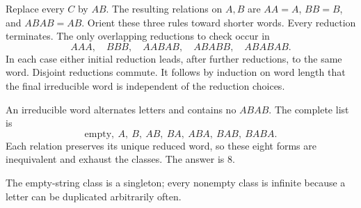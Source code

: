 Replace every $C$ by $AB$. The resulting relations on $A,B$ are $AA=A$, $BB=B$, and $ABAB=AB$. Orient these three rules toward shorter words. Every reduction terminates. The only overlapping reductions to check occur in
\[
AAA,\quad BBB,\quad AABAB,\quad ABABB,\quad ABABAB.
\]
In each case either initial reduction leads, after further reductions, to the same word. Disjoint reductions commute. It follows by induction on word length that the final irreducible word is independent of the reduction choices.

An irreducible word alternates letters and contains no $ABAB$. The complete list is
\[
\text{empty},\ A,\ B,\ AB,\ BA,\ ABA,\ BAB,\ BABA.
\]
Each relation preserves its unique reduced word, so these eight forms are inequivalent and exhaust the classes. The answer is $\boxed8$.

The empty-string class is a singleton; every nonempty class is infinite because a letter can be duplicated arbitrarily often.
